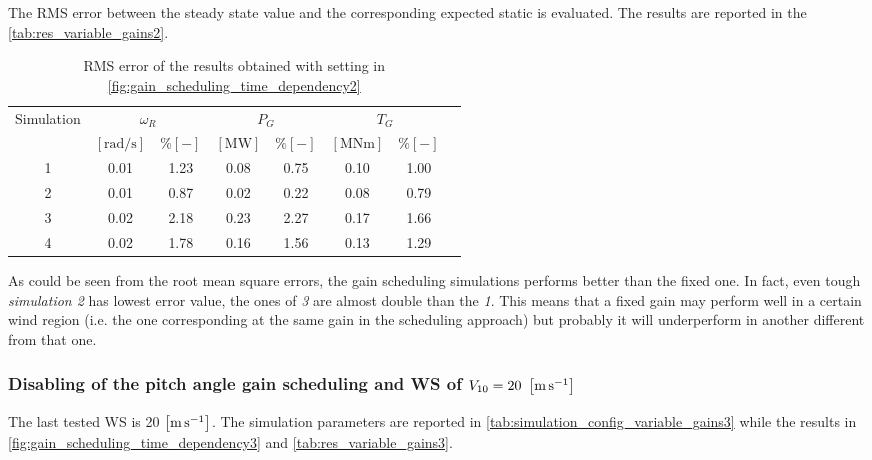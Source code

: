 The \acrshort{RMS} error between the steady state value and the corresponding expected static is evaluated. The results are reported in the \autoref{tab:res_variable_gains2}.
\begin{table}[htb]
  \caption{RMS error of the results obtained with setting in \autoref{fig:gain_scheduling_time_dependency2}}
  \centering
  \begin{tabular}{cccccccc}
    \toprule
      Simulation & \multicolumn{2}{c}{$\omega_R$} & \multicolumn{2}{c}{$P_G$} & \multicolumn{2}{c}{$T_G$} \\ 
       & $\left[\si{\radian\per\second}\right]$ & $ \% \left[-\right]$ & $\left[\si{\mega\watt}\right]$ & $ \% \left[-\right]$ & $\left[\si{\mega\newton\meter} \right]$ & $ \% \left[-\right]$ \\ \midrule      
     1 & 0.01 &  1.23 &  0.08  &  0.75  &  0.10  &  1.00 \\
     2 & 0.01 &  0.87 &  0.02  &  0.22  &  0.08  &  0.79 \\
     3 & 0.02 &  2.18 &  0.23  &  2.27  &  0.17  &  1.66 \\
     4 & 0.02 &  1.78 &  0.16  &  1.56  &  0.13  &  1.29 \\
    
     \bottomrule
  \end{tabular}
  \label{tab:res_variable_gains2}
\end{table}

As could be seen from the root mean square errors, the gain scheduling simulations performs better than the fixed one. In fact, even tough \textit{simulation 2} has lowest error value, the ones of \textit{3} are almost double than the \textit{1}. This means that a fixed gain may perform well in a certain wind region (i.e. the one corresponding at the same gain in the scheduling approach) but probably it will underperform in another different from that one.  

\subsubsection{Disabling of the pitch angle gain scheduling and WS of $V_{10} =  20 \ \mesunt{\meter\per\second}$}
The last tested \acrshort{WS} is 20 $\left[\si{\meter\per\second}\right]$. The simulation parameters are reported in \autoref{tab:simulation_config_variable_gains3} while the results in \autoref{fig:gain_scheduling_time_dependency3} and \autoref{tab:res_variable_gains3}.

